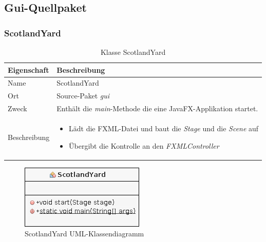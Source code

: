 \subsection{Gui-Quellpaket}
    \subsubsection{ScotlandYard}
        \begin{table}[H]
            \caption{Klasse ScotlandYard}
            \begin{tabular}{p{2.5cm}  p{9.5cm}} 
                \hline
                \textbf{Eigenschaft} & \textbf{Beschreibung}\\
                \hline
                Name & ScotlandYard\\
                Ort & Source-Paket \textit{gui}\\
                \hline
                Zweck &
                Enthält die \textit{main}-Methode die eine JavaFX-Applikation startet.\\
                \hline
                Beschreibung &
                \begin{itemize}
                    \itemsep0em
                    \item Lädt die FXML-Datei und baut die \textit{Stage} und die \textit{Scene} auf
                    \item Übergibt die Kontrolle an den \textit{FXMLController}
                \end{itemize}
                \\
                \hline
            \end{tabular}
        \end{table}
        \begin{figure}[H]
            \centering
            \includegraphics[scale=0.7]{img/uml/scotlandYard.png}   
            \caption{ScotlandYard UML-Klassendiagramm}
        \end{figure}


